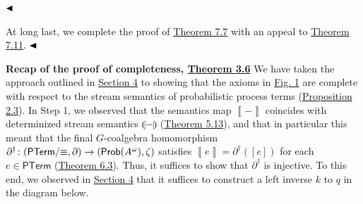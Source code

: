 \hypertarget{html:S7.SS0.SSS0.P0.SPx7.p2.m16}{}\({\hfill\blacktriangleleft}\)
\par\medskip
\hypertarget{html:S7.SS0.SSS0.P0.SPx7.p3}{} At long last, we complete the proof of \hyperlink{html:S7.Thmtheorem7}{Theorem 7.7} with an appeal to \hyperlink{html:S7.Thmtheorem11}{Theorem 7.11}. %
\hypertarget{html:S7.SS0.SSS0.P0.SPx7.p3.m1}{}\({\hfill\blacktriangleleft}\)
\par\medskip
\hypertarget{html:S7.SS0.SSS0.Px1}{} \par\noindent\textbf{Recap of the proof of completeness, \hyperlink{html:S3.Thmtheorem6}{Theorem 3.6}}\quad  %
\hypertarget{html:S7.SS0.SSS0.Px1.p1}{} We have taken the approach outlined in \hyperlink{html:S4}{Section 4} to showing that the axioms in \hyperlink{html:S3.F1}{Fig. 1} are complete with respect to the stream semantics of probabilistic process terms (\hyperlink{html:S2.Thmtheorem3}{Proposition 2.3}). In Step 1, we observed that the semantics map %
\hypertarget{html:S7.SS0.SSS0.Px1.p1.m1}{}\({\left\llbracket{-}\right\rrbracket}\) coincides with determinized stream semantics %
\hypertarget{html:S7.SS0.SSS0.Px1.p1.m2}{}\({\llparenthesis{-}\rrparenthesis}\) (\hyperlink{html:S5.Thmtheorem13}{Theorem 5.13}), and that in particular this meant that the final %
\hypertarget{html:S7.SS0.SSS0.Px1.p1.m3}{}\({G}\)-coalgebra homomorphism %
\hypertarget{html:S7.SS0.SSS0.Px1.p1.m4}{}\({\partial^{\dagger}\colon(\mathsf{PTerm}/{\equiv},\partial)\to(\text{\sf Prob}(A^{\omega}),\zeta)}\) satisfies %
\hypertarget{html:S7.SS0.SSS0.Px1.p1.m5}{}\({\left\llbracket{e}\right\rrbracket=\partial^{\dagger}([e])}\) for each %
\hypertarget{html:S7.SS0.SSS0.Px1.p1.m6}{}\({e\in\mathsf{PTerm}}\) (\hyperlink{html:S6.Thmtheorem3}{Theorem 6.3}). Thus, it suffices to show that %
\hypertarget{html:S7.SS0.SSS0.Px1.p1.m7}{}\({\partial^{\dagger}}\) is injective. To this end, we observed in \hyperlink{html:S4}{Section 4} that it suffices to construct a left inverse %
\hypertarget{html:S7.SS0.SSS0.Px1.p1.m8}{}\({k}\) to %
\hypertarget{html:S7.SS0.SSS0.Px1.p1.m9}{}\({q}\) in the diagram below.
